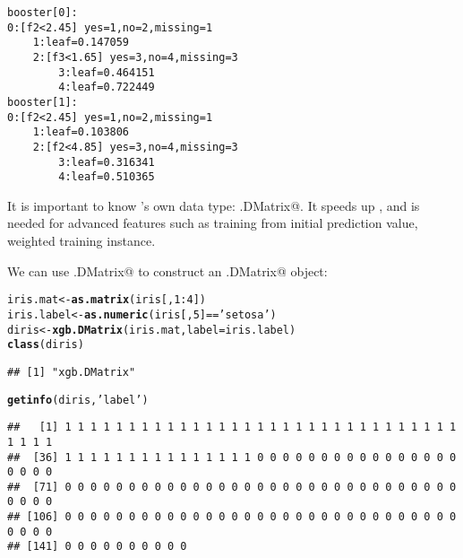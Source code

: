 \documentclass{article}\usepackage[]{graphicx}\usepackage[]{color}
\makeatletter
\newcommand{\hlnum}[1]{\textcolor[rgb]{0.686,0.059,0.569}{#1}}%
\newcommand{\hlstr}[1]{\textcolor[rgb]{0.192,0.494,0.8}{#1}}%
\newcommand{\hlopt}[1]{\textcolor[rgb]{0,0,0}{#1}}%
\newcommand{\hlstd}[1]{\textcolor[rgb]{0.345,0.345,0.345}{#1}}%
\newcommand{\hlkwb}[1]{\textcolor[rgb]{0.69,0.353,0.396}{#1}}%
\newcommand{\hlkwc}[1]{\textcolor[rgb]{0.333,0.667,0.333}{#1}}%
\newcommand{\hlkwd}[1]{\textcolor[rgb]{0.737,0.353,0.396}{\textbf{#1}}}%
\newenvironment{kframe}{%
 \def\at@end@of@kframe{}%
 \ifinner\ifhmode%
  \def\at@end@of@kframe{\end{minipage}}%
  \begin{minipage}{\columnwidth}%
 \fi\fi%
 \def\FrameCommand##1{\hskip\@totalleftmargin \hskip-\fboxsep
 \colorbox{shadecolor}{##1}\hskip-\fboxsep
     \hskip-\linewidth \hskip-\@totalleftmargin \hskip\columnwidth}%
 \MakeFramed {\advance\hsize-\width
   \@totalleftmargin\z@ \linewidth\hsize
   \@setminipage}}%
 {\par\unskip\endMakeFramed%
 \at@end@of@kframe}
\newenvironment{knitrout}{}{} %
\makeatother
\begin{document}
\begin{verbatim}
booster[0]:
0:[f2<2.45] yes=1,no=2,missing=1
    1:leaf=0.147059
    2:[f3<1.65] yes=3,no=4,missing=3
        3:leaf=0.464151
        4:leaf=0.722449
booster[1]:
0:[f2<2.45] yes=1,no=2,missing=1
    1:leaf=0.103806
    2:[f2<4.85] yes=3,no=4,missing=3
        3:leaf=0.316341
        4:leaf=0.510365
\end{verbatim}

It is important to know \verb@xgboost@'s own data type: \verb@xgb.DMatrix@.
It speeds up \verb@xgboost@, and is needed for advanced features such as 
training from initial prediction value, weighted training instance. 

We can use \verb@xgb.DMatrix@ to construct an \verb@xgb.DMatrix@ object:
\begin{knitrout}
\color{fgcolor}\begin{kframe}
\begin{alltt}
\hlstd{iris.mat} \hlkwb{<-} \hlkwd{as.matrix}\hlstd{(iris[,}\hlnum{1}\hlopt{:}\hlnum{4}\hlstd{])}
\hlstd{iris.label} \hlkwb{<-} \hlkwd{as.numeric}\hlstd{(iris[,}\hlnum{5}\hlstd{]}\hlopt{==}\hlstr{'setosa'}\hlstd{)}
\hlstd{diris} \hlkwb{<-} \hlkwd{xgb.DMatrix}\hlstd{(iris.mat,} \hlkwc{label} \hlstd{= iris.label)}
\hlkwd{class}\hlstd{(diris)}
\end{alltt}
\begin{verbatim}
## [1] "xgb.DMatrix"
\end{verbatim}
\begin{alltt}
\hlkwd{getinfo}\hlstd{(diris,}\hlstr{'label'}\hlstd{)}
\end{alltt}
\begin{verbatim}
##   [1] 1 1 1 1 1 1 1 1 1 1 1 1 1 1 1 1 1 1 1 1 1 1 1 1 1 1 1 1 1 1 1 1 1 1 1
##  [36] 1 1 1 1 1 1 1 1 1 1 1 1 1 1 1 0 0 0 0 0 0 0 0 0 0 0 0 0 0 0 0 0 0 0 0
##  [71] 0 0 0 0 0 0 0 0 0 0 0 0 0 0 0 0 0 0 0 0 0 0 0 0 0 0 0 0 0 0 0 0 0 0 0
## [106] 0 0 0 0 0 0 0 0 0 0 0 0 0 0 0 0 0 0 0 0 0 0 0 0 0 0 0 0 0 0 0 0 0 0 0
## [141] 0 0 0 0 0 0 0 0 0 0
\end{verbatim}
\end{kframe}
\end{knitrout}
\end{document}
